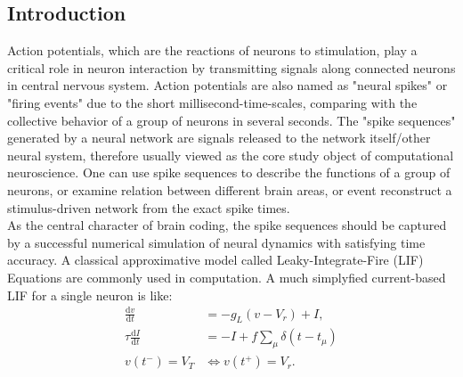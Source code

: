 \documentclass[10pt]{article}
\begin{document}
\begin{multicols}{2}


\section{Introduction}
\noindent
Action potentials, which are the reactions of neurons to stimulation, play a critical role in neuron interaction by transmitting signals along connected neurons in  central nervous system. %
Action potentials are also named as "neural spikes" or "firing events" due to the short millisecond-time-scales, comparing with the collective behavior of a group of neurons in several seconds. The "spike sequences" generated by a neural network are signals released to the network itself/other neural system, therefore usually viewed as the core study object of computational neuroscience. One can use spike sequences to describe the functions of a group of neurons, or examine relation between different brain areas, or event reconstruct a stimulus-driven network from the exact spike times. \\
\indent
As the central character of brain coding, the spike sequences should be captured by a successful numerical simulation of neural dynamics with satisfying time accuracy. A classical approximative model called Leaky-Integrate-Fire (LIF) Equations are commonly used in computation. A much simplyfied current-based LIF for a single neuron is like: 
\begin{subequations}
\begin{align}
     \frac{\mbox{d}v}{\mbox{d}t}& =  - g_L(v-V_r)+I, \label{simIF}\\
    \tau \frac{\mbox{d}I}{\mbox{d}t}&=-I+f \sum_{\mu}\delta(t-t_{\mu}) \nonumber\\
     v(t^-)=V_T &\Leftrightarrow v(t^+)= V_{r}. \label{simBC}
\end{align}
\end{subequations}

\end{multicols}
\end{document}
